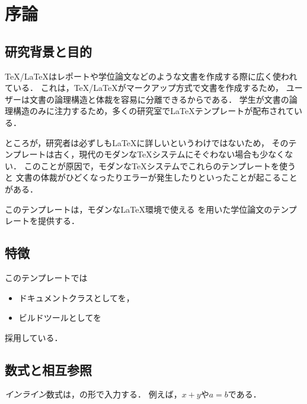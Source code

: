 \chapter{序論} \label{chap:introduction}

\section{研究背景と目的} \label{sec:chap::introduction_background}

{\TeX}/{\LaTeX}はレポートや学位論文などのような文書を作成する際に広く使われている．
これは，{\TeX}/{\LaTeX}がマークアップ方式で文書を作成するため，
ユーザーは文書の論理構造と体裁を容易に分離できるからである．
学生が文書の論理構造のみに注力するため，多くの研究室で{\LaTeX}テンプレートが配布されている．

ところが，研究者は必ずしも{\LaTeX}に詳しいというわけではないため，
そのテンプレートは古く，現代のモダンな{\TeX}システムにそぐわない場合も少なくない．
このことが原因で，モダンな{\TeX}システムでこれらのテンプレートを使うと
文書の体裁がひどくなったりエラーが発生したりといったことが起こることがある．

このテンプレートは，モダンな{\LaTeX}環境で使える
{\LuaLaTeX}を用いた学位論文のテンプレートを提供する．

\section{特徴} \label{sec:chap::introduction_feature}

このテンプレートでは
\begin{itemize}
    \item ドキュメントクラスとしてを，
    \item ビルドツールとしてを
\end{itemize}
採用している．

\section{数式と相互参照} \label{sec:chap::introduction_equation}

\emph{インライン}数式は，の形で入力する．
例えば，$x + y$や$a = b$である．

